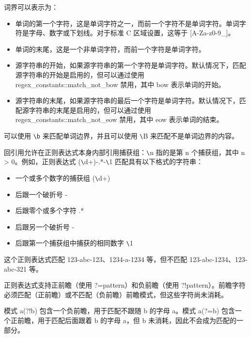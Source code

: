 
词界可以表示为：

\begin{itemize}
\item
单词的第一个字符，这是单词字符之一，而前一个字符不是单词字符。单词字符是字母、数字或下划线。对于标准 C 区域设置，这等于 [A-Za-z0-9\_]。

\item
单词的末尾，这是一个非单词字符，而前一个字符是单词字符。

\item
源字符串的开始，如果源字符串的第一个字符是单词字符。默认情况下，匹配源字符串的开始是启用的，但可以通过使用 regex\_constants::match\_not\_bow 禁用，其中 bow 表示单词的开始。

\item
源字符串的末尾，如果源字符串的最后一个字符是单词字符。默认情况下，匹配源字符串的末尾是启用的，但可以通过使用 regex\_constants::match\_not\_eow 禁用，其中 eow 表示单词的结束。
\end{itemize}

可以使用 \verb|\b| 来匹配单词边界，并且可以使用 \verb|\|B 来匹配不是单词边界的内容。


回引用允许在正则表达式本身内部引用捕获组：\verb|\|n 指的是第 n 个捕获组，其中 n > 0。例如，正则表达式 (\verb|\|d+)-.*-\verb|\|1 匹配具有以下格式的字符串：

\begin{itemize}
\item
一个或多个数字的捕获组 (\verb|\|d+)

\item
后跟一个破折号 -

\item
后跟零个或多个字符 .*

\item
后跟另一个破折号 -

\item
后跟第一个捕获组中捕获的相同数字 \verb|\|1
\end{itemize}

这个正则表达式匹配 123-abc-123、1234-a-1234 等，但不匹配 123-abc-1234、123-abc-321 等。


正则表达式支持正前瞻（使用 ?=pattern）和负前瞻（使用 ?!pattern）。前瞻字符必须匹配（正前瞻）或不匹配（负前瞻）前瞻模式，但这些字符尚未消耗。

模式 a(?!b) 包含一个负前瞻，用于匹配不跟随 b 的字母 a。模式 a(?=b) 包含一个正前瞻，用于匹配后面跟着 b 的字母 a，但 b 未消耗，因此不会成为匹配的一部分。

